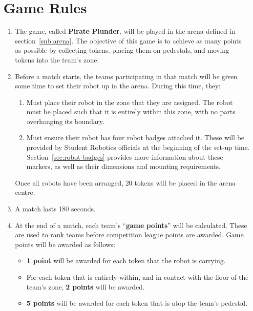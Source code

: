 \section {Game Rules}
\label{game-rules}

\begin{enumerate}
\item The game, called \textbf{Pirate Plunder}, will be played in the arena defined in section~\ref{sub:arena}.
      The objective of this game is to achieve as many points as possible by collecting tokens,
       placing them on pedestals, and moving tokens into the team's zone.

\item Before a match starts, the teams participating in that match will be given some time to set their robot up in the arena.
      During this time, they:
\begin{enumerate}
  \item Must place their robot in the zone that they are assigned.
        The robot must be placed such that it is entirely within this zone, with no parts overhanging its boundary.

  \item Must ensure their robot has four robot badges attached it.
        These will be provided by Student Robotics officials at the beginning of the set-up time.
        Section~\ref{sec:robot-badges} provides more information about these markers, as well as their dimensions and mounting requirements.
\end{enumerate}
      Once all robots have been arranged, 20 tokens will be placed in the arena centre.

\item A match lasts 180 seconds.

\item At the end of a match, each team's ``\textbf{game points}'' will be calculated.
      These are used to rank teams before competition league points are awarded.
      Game points will be awarded as follows:
\begin{itemize}
  \item \textbf{1 point} will be awarded for each token that the robot is carrying.
  \item For each token that is entirely within, and in contact with the floor of the team's zone, \textbf{2 points} will be awarded.
  \item \textbf{5 points} will be awarded for each token that is atop the team's pedestal.


\end{itemize}
\end{enumerate}
